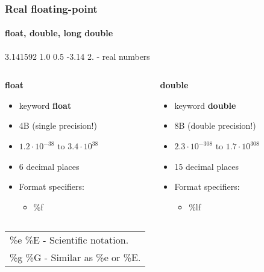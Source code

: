 \documentclass[10pt]{beamer}
\newcommand{\tabitem}{%
  \usebeamertemplate{itemize item}\hspace*{\labelsep}}
\begin{document}
\begin{frame}
  \frametitle{Real floating-point}
  \framesubtitle{float, double, long double}
   3.141592 1.0 0.5 -3.14 2. - real numbers \\
  
  \begin{columns}
    \begin{column}{0.5\textwidth}
    \centering
      {\large \bf float}
      \begin{itemize}
      \item keyword {\bf float}
      \item 4B (single precision!)
      \item $1.2\cdot10^{-38}$ to $3.4\cdot10^{38}$
      \item 6 decimal places
      \item Format specifiers:
        \begin{itemize}
          \item \%f
        \end{itemize}
    \end{itemize}
    \end{column}
    \begin{column}{0.5\textwidth}
    \centering
      {\large \bf double}
      \begin{itemize}
      \item keyword {\bf double}
      \item 8B (double precision!)
      \item $2.3\cdot10^{-308}$ to $1.7\cdot10^{308}$
      \item 15 decimal places
      \item Format specifiers:
        \begin{itemize}
          \item \%lf
        \end{itemize}
    \end{itemize}
    \end{column}
  \end{columns}
  
  \begin{center}
    \begin{tabular}{@{}l@{}}
        \tabitem \%e \%E	- Scientific notation.\\
        \tabitem \%g \%G - Similar as \%e or \%E.
    \end{tabular}
  \end{center}

\end{frame}
\end{document}
